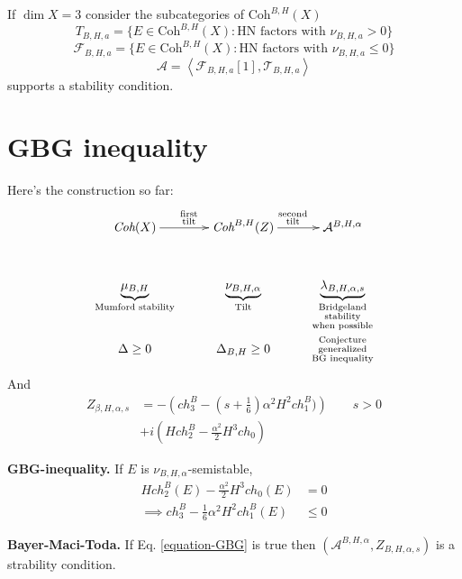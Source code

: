 \medskip\noindent
If $\dim X=3$ consider the subcategories of $\text{Coh}^{B,H}(X)$
$$
T_{B,H,a}=\{E \in \text{Coh}^{B,H}(X):\text{HN factors with }
\nu_{B,H,a}>0\}
$$
$$
\mathcal{F}_{B,H,a}=\{E \in \text{Coh}^{B,H}(X):\text{HN factors with }
\nu_{B,H,a}\leq 0\}
$$
$$
\mathcal{A}=\left<\mathcal{F}_{B,H,a}[1],\mathcal{T}_{B,H,a}\right>
$$
supports a stability condition.

\section{GBG inequality}
\label{section-GBG-inequality}

Here's the construction so far:
$$
\xymatrixrowsep{1.4em}
\xymatrix{
\textit{Coh}(X)\ar[r]^{\substack{\text{first} \\ \text{tilt}}}
&  \textit{Coh}^{B,H}(Z)\ar[r]^{\substack{\text{second} \\ \text{tilt}}}
&  \mathcal{A}^{B,H,\alpha}\\
\underbrace{\mu_{B,H}}_{\text{Mumford stability}}
&  \underbrace{\nu_{B,H,\alpha}}_{\text{Tilt}}
&  \underbrace{\lambda_{B,H,\alpha,s}}
_{\substack{\text{Bridgeland} \\ \text{stability}\\\text{when possible}}}\\
\Delta \geq 0
&  \Delta_{B,H}\geq 0
&\substack{\text{Conjecture} \\ \text{generalized}\\\text{BG inequality}}
}
$$
And
\begin{align*}
Z_{\beta,H,\alpha,s}&=-\left(ch^B_3-\left(s+\frac{1}{6}\right)\alpha^2
H^2ch_1^B)\right)\qquad s>0\\
&+i\left(Hch_2^B-\frac{\alpha^2}{2}H^3ch_0\right) 
\end{align*}

\medskip\noindent
{\bf GBG-inequality.} If $E$ is $\nu_{B,H,\alpha}$-semistable,
\begin{equation}
\label{equation-GBG}
\begin{aligned}
H ch_2^B(E)-\frac{\alpha^2}{2}H^3 ch_0(E)&=0\\
\implies ch_3^{B}-\frac{1}{6}\alpha^2H^2ch_1^B(E)&\leq 0
\end{aligned}
\end{equation}

\medskip\noindent
{\bf Bayer-Maci-Toda.} If Eq. \ref{equation-GBG} is true then 
$(\mathcal{A}^{B,H,\alpha},Z_{B,H,\alpha,s})$ is a strability condition.

